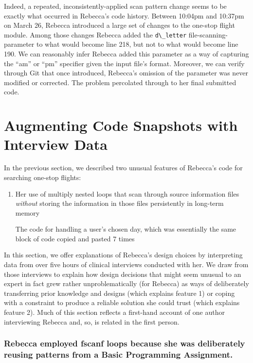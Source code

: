 Indeed, a repeated, inconsistently-applied scan pattern change seems to be exactly what occurred in Rebecca's code history. Between 10:04pm and 10:37pm on March 26, Rebecca introduced a large set of changes to the one-stop flight module. Among those changes Rebecca added the \texttt{d\textbackslash{}\_letter} file-scanning-parameter to what would become line 218, but not to what would become line 190. We can reasonably infer Rebecca added this parameter as a way of capturing the ``am'' or ``pm'' specifier given the input file's format. Moreover, we can verify through Git that once introduced, Rebecca's omission of the parameter was never modified or corrected. The problem percolated through to her final submitted code.

\section{Augmenting Code Snapshots with Interview Data}\label{analysis-augmenting-code-snapshots-with-interview-data}

In the previous section, we described two unusual features of Rebecca's code for searching one-stop flights:

\begin{enumerate}
\def\labelenumi{\arabic{enumi}.}
\item
  Her use of multiply nested loops that scan through source information files \emph{without} storing the information in those files persistently in long-term memory

  The code for handling a user's chosen day, which was essentially the same block of code copied and pasted 7 times
\end{enumerate}

In this section, we offer explanations of Rebecca's design choices by interpreting data from over five hours of clinical interviews conducted with her. We draw from those interviews to explain how design decisions that might seem unusual to an expert in fact grew rather unproblematically (for Rebecca) as ways of deliberately transferring prior knowledge and designs (which explains feature 1) or coping with a constraint to produce a reliable solution she could trust (which explains feature 2). Much of this section reflects a first-hand account of one author interviewing Rebecca and, so, is related in the first person.

\subsubsection{Rebecca employed fscanf loops because she was deliberately reusing patterns from a Basic Programming Assignment.}\label{rebecca-employed-fscanf-loops-because-she-was-deliberately-reusing-from-an-basic-programming-assignment.}

